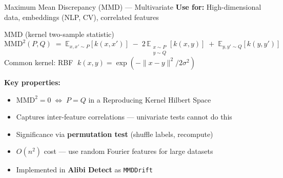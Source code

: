 \documentclass[10pt,aspectratio=169]{beamer}
\begin{document}
\begin{frame}{Maximum Mean Discrepancy (MMD) --- Multivariate}
  \textbf{Use for:} High-dimensional data, embeddings (NLP, CV), correlated features
  \vspace{0.15cm}
  \begin{block}{MMD (kernel two-sample statistic)}
    \[
      \mathrm{MMD}^2(P,Q) \;=\;
        \mathbb{E}_{x,x'\sim P}[k(x,x')]
        \;-\; 2\,\mathbb{E}_{\substack{x\sim P \\ y\sim Q}}[k(x,y)]
        \;+\; \mathbb{E}_{y,y'\sim Q}[k(y,y')]
    \]
    Common kernel: RBF $\;k(x,y)=\exp\!\left(-\|x-y\|^2/2\sigma^2\right)$
  \end{block}
  \vspace{0.2cm}
  \textbf{Key properties:}
  \begin{itemize}
    \item $\mathrm{MMD}^2 = 0 \;\Leftrightarrow\; P = Q$ in a Reproducing Kernel Hilbert Space
    \item Captures inter-feature correlations --- univariate tests cannot do this
    \item Significance via \textbf{permutation test} (shuffle labels, recompute)
    \item $O(n^2)$ cost --- use random Fourier features for large datasets
    \item Implemented in \textbf{Alibi Detect} as \texttt{MMDDrift}
  \end{itemize}
\end{frame}
\end{document}

